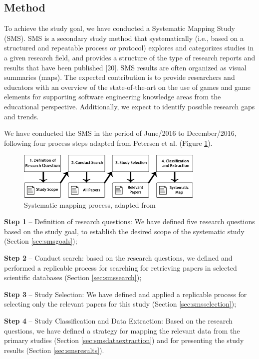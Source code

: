\subsection{Method}
\label{sec:smsmethod}

To achieve the study goal, we have conducted a Systematic Mapping Study (SMS). SMS is a secondary study method that systematically (i.e., based on a structured and repeatable process or protocol) explores and categorizes studies in a given research field, and provides a structure of the type of research reports and results that have been published \citep{Petersen:2007}[20]. SMS results are often organized as visual summaries (maps). The expected contribution is to provide researchers and educators with an overview of the state-of-the-art on the use of games and game elements for supporting software engineering knowledge areas from the educational perspective. Additionally, we expect to identify possible research gaps and trends.

We have conducted the SMS in the period of June/2016 to December/2016, following four process steps adapted from Petersen et al. \citep{Petersen:2007} (Figure \ref{fig:smsprocess}).

\begin{figure}[!h]%
\centering
\includegraphics[width=0.8\textwidth]{img/smsprocess.png}
\caption{Systematic mapping process, adapted from \cite{Petersen:2007}}
\label{fig:smsprocess}
\end{figure} 

\textbf{Step 1} – Definition of research questions: We have defined five research questions based on the study goal, to establish the desired scope of the systematic study (Section \ref{sec:smsgoals});

\textbf{Step 2} – Conduct search: based on the research questions, we defined and performed a replicable process for searching for retrieving papers in selected scientific databases (Section \ref{sec:smssearch});

\textbf{Step 3} – Study Selection: We have defined and applied a replicable process for selecting only the relevant papers for this study (Section \ref{sec:smsselection});

\textbf{Step 4} – Study Classification and Data Extraction: Based on the research questions, we have defined a strategy for mapping the relevant data from the primary studies (Section \ref{sec:smsdataextraction}) and for presenting the study results (Section \ref{sec:smsresults}). 

